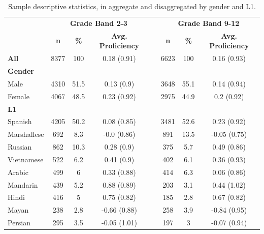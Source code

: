 \documentclass [PhD] {uclathes}
\begin{document}
\begin{table}[htbp]
\centering
\caption{\label{smp_dscr} Sample descriptive statistics, in aggregate and disaggregated by gender and L1.}
\begin{tabular}{lccccccc}
\toprule
    & \multicolumn{3}{c}{\textbf{Grade Band 2-3}} & \multicolumn{1}{c}{ } & \multicolumn{3}{c}{\textbf{Grade Band 9-12}} \\
    \cline{2-4}
    \cline{6-8}
     & \textbf{n} & \textbf{\%} & \textbf{Avg. Proficiency} & & \textbf{n} & \textbf{\%} & \textbf{Avg. Proficiency} \\
    \midrule
    \textbf{All} & 8377 & 100 & 0.18 (0.91) & & 6623 & 100 & 0.16 (0.93) \\
    \textbf{Gender} &  &  &  & &  &  &  \\
    \hspace{3mm} Male & 4310 & 51.5 & 0.13 (0.9) & & 3648 & 55.1 & 0.14 (0.94) \\
    \hspace{3mm} Female & 4067 & 48.5 & 0.23 (0.92) & & 2975 & 44.9 & 0.2 (0.92) \\
    \textbf{L1} &  &  &  & &  &  &  \\
    \hspace{3mm} Spanish & 4205 & 50.2 & 0.08 (0.85) & & 3481 & 52.6 & 0.23 (0.92) \\
    \hspace{3mm} Marshallese & 692 & 8.3 & -0.0 (0.86) & & 891 & 13.5 & -0.05 (0.75) \\
    \hspace{3mm} Russian & 862 & 10.3 & 0.28 (0.9) & & 375 & 5.7 & 0.49 (0.86) \\
    \hspace{3mm} Vietnamese & 522 & 6.2 & 0.41 (0.9) & & 402 & 6.1 & 0.36 (0.93) \\
    \hspace{3mm} Arabic & 499 & 6 & 0.33 (0.88) & & 414 & 6.3 & 0.06 (0.86) \\
    \hspace{3mm} Mandarin & 439 & 5.2 & 0.88 (0.89) & & 203 & 3.1 & 0.44 (1.02) \\
    \hspace{3mm} Hindi & 416 & 5 & 0.75 (0.82) & & 185 & 2.8 & 0.67 (0.82) \\
    \hspace{3mm} Mayan & 238 & 2.8 & -0.66 (0.88) & & 258 & 3.9 & -0.84 (0.95) \\
    \hspace{3mm} Persian & 295 & 3.5 & -0.05 (1.01) & & 197 & 3 & -0.07 (0.94) \\

\end{tabular}
\end{table}
\end{document}
